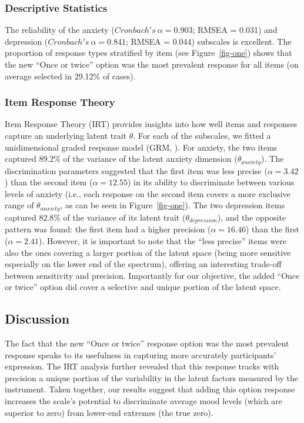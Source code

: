 \documentclass[
  jou,
  floatsintext,
  longtable,
  nolmodern,
  notxfonts,
  notimes,
  colorlinks=true,linkcolor=blue,citecolor=blue,urlcolor=blue]{apa7}
\begin{document}
\subsubsection{Descriptive Statistics}\label{descriptive-statistics}

The reliability of the anxiety (\(Cronbach's~\alpha = 0.903\); RMSEA =
0.031) and depression (\(Cronbach's~\alpha = 0.841\); RMSEA = 0.044)
subscales is excellent. The proportion of response types stratified by
item (see Figure~\ref{fig-one}) shows that the new ``Once or twice''
option was the most prevalent response for all items (on average
selected in 29.12\% of cases).

\subsubsection{Item Response Theory}\label{item-response-theory}

Item Response Theory (IRT) provides insights into how well items and
responses capture an underlying latent trait \(\theta\). For each of the
subscales, we fitted a unidimensional graded response model (GRM,
). For anxiety, the two
items captured 89.2\% of the variance of the latent anxiety dimension
(\(\theta_{anxiety}\)). The discrimination parameters suggested that the
first item was less precise (\(\alpha = 3.42\)) than the second item
(\(\alpha = 12.55\)) in its ability to discriminate between various
levels of anxiety (i.e., each response on the second item covers a more
exclusive range of \(\theta_{anxiety}\), as can be seen in
Figure~\ref{fig-one}). The two depression items captured 82.8\% of the
variance of its latent trait (\(\theta_{depression}\)), and the opposite
pattern was found: the first item had a higher precision
(\(\alpha = 16.46\)) than the first (\(\alpha = 2.41\)). However, it is
important to note that the ``less precise'' items were also the ones
covering a larger portion of the latent space (being more sensitive
especially on the lower end of the spectrum), offering an interesting
trade-off between sensitivity and precision. Importantly for our
objective, the added ``Once or twice'' option did cover a selective and
unique portion of the latent space.

\subsection{Discussion}\label{discussion}

The fact that the new ``Once or twice'' response option was the most
prevalent response speaks to its usefulness in capturing more accurately
participants' expression. The IRT analysis further revealed that this
response tracks with precision a unique portion of the variability in
the latent factors measured by the instrument. Taken together, our
results suggest that adding this option response increases the scale's
potential to discriminate average mood levels (which are superior to
zero) from lower-end extremes (the true zero).
\end{document}
